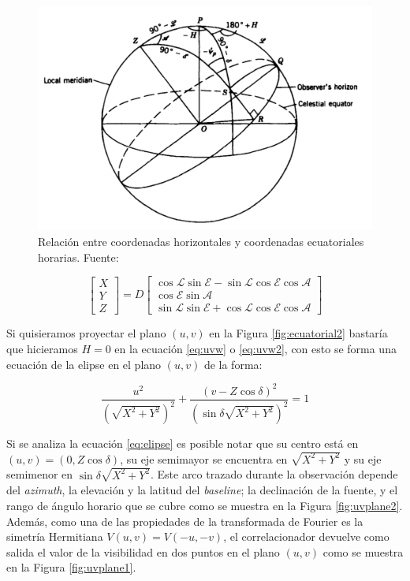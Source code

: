 \begin{figure}[h!]
\centering
\includegraphics[scale=0.3]{images/horizontales.png}
\caption{Relación entre coordenadas horizontales y coordenadas ecuatoriales horarias. Fuente: \citep{libroAstro}}
\label{fig:horizontal}
\end{figure}


\begin{equation}
\begin{bmatrix}
X\\
Y\\
Z
\end{bmatrix}
=
D
\begin{bmatrix}
\cos{\mathscr{L}}\sin{\mathscr{E}}-\sin{\mathscr{L}}\cos{\mathscr{E}}\cos{\mathscr{A}}\\
\cos{\mathscr{E}}\sin{\mathscr{A}}\\
\sin{\mathscr{L}}\sin{\mathscr{E}}+\cos{\mathscr{L}}\cos{\mathscr{E}}\cos{\mathscr{A}}
\end{bmatrix}
\end{equation}



Si quisieramos proyectar el plano $(u,v)$ en la Figura \ref{fig:ecuatorial2} bastaría que hicieramos $H=0$ en la ecuación \ref{eq:uvw} o \ref{eq:uvw2}, con esto se forma una ecuación de la elipse en el plano $(u,v)$ de la forma:

\begin{equation}
\frac{u^2}{(\sqrt{X^{2}+Y^{2}})^2}+\frac{(v-Z\cos{\delta})^2}{(\sin{\delta}\sqrt{X^{2}+Y^{2}})^2} = 1
\label{eq:elipse}
\end{equation}

Si se analiza la ecuación \ref{eq:elipse} es posible notar que su centro está en $(u,v)=(0,Z\cos{\delta})$, su eje semimayor se encuentra en $\sqrt{X^{2}+Y^{2}}$ y su eje semimenor en $\sin{\delta}\sqrt{X^{2}+Y^{2}}$. Este arco trazado durante la observación depende del \textit{azimuth}, la elevación y la latitud del \textit{baseline}; la declinación de la fuente, y el rango de ángulo horario que se cubre como se muestra en la Figura \ref{fig:uvplane2}. Además, como una de las propiedades de la transformada de Fourier es la simetría Hermitiana $V(u,v)=V(-u,-v)$, el correlacionador devuelve como salida el valor de la visibilidad en dos puntos en el plano $(u,v)$ como se muestra en la Figura \ref{fig:uvplane1}.

